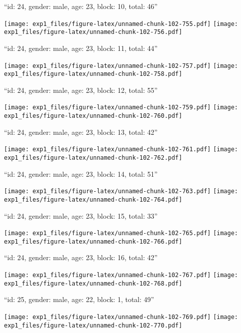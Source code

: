 \documentclass[11pt,,]{article}
\begin{document}
\newpage
[1] 

``id: 24, gender: male, age: 23, block: 10, total: 46''

\texttt{[image: exp1\_files/figure-latex/unnamed-chunk-102-755.pdf]}
\texttt{[image: exp1\_files/figure-latex/unnamed-chunk-102-756.pdf]}

\newpage
[1] 

``id: 24, gender: male, age: 23, block: 11, total: 44''

\texttt{[image: exp1\_files/figure-latex/unnamed-chunk-102-757.pdf]}
\texttt{[image: exp1\_files/figure-latex/unnamed-chunk-102-758.pdf]}

\newpage
[1] 

``id: 24, gender: male, age: 23, block: 12, total: 55''

\texttt{[image: exp1\_files/figure-latex/unnamed-chunk-102-759.pdf]}
\texttt{[image: exp1\_files/figure-latex/unnamed-chunk-102-760.pdf]}

\newpage
[1] 

``id: 24, gender: male, age: 23, block: 13, total: 42''

\texttt{[image: exp1\_files/figure-latex/unnamed-chunk-102-761.pdf]}
\texttt{[image: exp1\_files/figure-latex/unnamed-chunk-102-762.pdf]}

\newpage
[1] 

``id: 24, gender: male, age: 23, block: 14, total: 51''

\texttt{[image: exp1\_files/figure-latex/unnamed-chunk-102-763.pdf]}
\texttt{[image: exp1\_files/figure-latex/unnamed-chunk-102-764.pdf]}

\newpage
[1] 

``id: 24, gender: male, age: 23, block: 15, total: 33''

\texttt{[image: exp1\_files/figure-latex/unnamed-chunk-102-765.pdf]}
\texttt{[image: exp1\_files/figure-latex/unnamed-chunk-102-766.pdf]}

\newpage
[1] 

``id: 24, gender: male, age: 23, block: 16, total: 42''

\texttt{[image: exp1\_files/figure-latex/unnamed-chunk-102-767.pdf]}
\texttt{[image: exp1\_files/figure-latex/unnamed-chunk-102-768.pdf]}

\newpage
[1] 

``id: 25, gender: male, age: 22, block: 1, total: 49''

\texttt{[image: exp1\_files/figure-latex/unnamed-chunk-102-769.pdf]}
\texttt{[image: exp1\_files/figure-latex/unnamed-chunk-102-770.pdf]}
\end{document}
